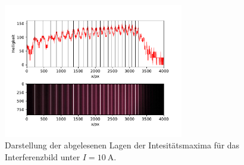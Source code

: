 \begin{figure}
  \centering
  \includegraphics[width = 0.7\textwidth]{../Messdaten/plots/peaks_rot_sigma_10.pdf}
  \caption{Darstellung der abgelesenen Lagen der Intesitätsmaxima für das Interferenzbild unter $I =\SI{10}{\ampere}$.}
  \label{fig: peaks_rot_10}
\end{figure}

